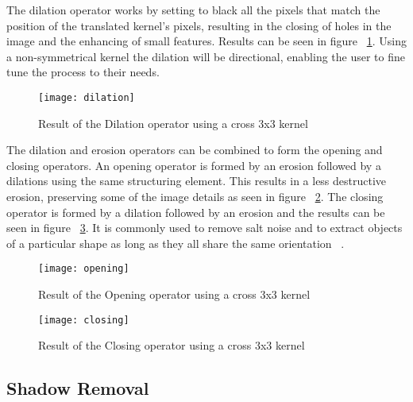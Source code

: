 The dilation operator works by setting to black all the pixels that match the position of the translated kernel's pixels, resulting in the closing of holes in the image and the enhancing of small features. Results can be seen in figure ~\ref{fig:dilation}. Using a non-symmetrical kernel the dilation will be directional, enabling the user to fine tune the process to their needs.

\begin{figure}[h]
  \begin{center}
    \leavevmode
    \texttt{[image: dilation]}
    \captionsetup{justification=centering}
    \caption{Result of the Dilation operator using a cross 3x3 kernel}
    \label{fig:dilation}
  \end{center}
\end{figure}

The dilation and erosion operators can be combined to form the opening and closing operators. An opening operator is formed by an erosion followed by a dilations using the same structuring element. This results in a less destructive erosion, preserving some of the image details as seen in figure ~\ref{fig:opening}. The closing operator is formed by a dilation followed by an erosion and the results can be seen in figure ~\ref{fig:closing}. It is commonly used to remove salt noise and to extract objects of a particular shape as long as they all share the same orientation ~\cite{fisher_morphology_2003}.

\begin{figure}[H]
  \begin{center}
    \leavevmode
    \texttt{[image: opening]}
    \captionsetup{justification=centering}
    \caption{Result of the Opening operator using a cross 3x3 kernel}
    \label{fig:opening}
  \end{center}
\end{figure}

\begin{figure}[H]
  \begin{center}
    \leavevmode
    \texttt{[image: closing]}
    \captionsetup{justification=centering}
    \caption{Result of the Closing operator using a cross 3x3 kernel}
    \label{fig:closing}
  \end{center}
\end{figure}

\subsection{Shadow Removal}


